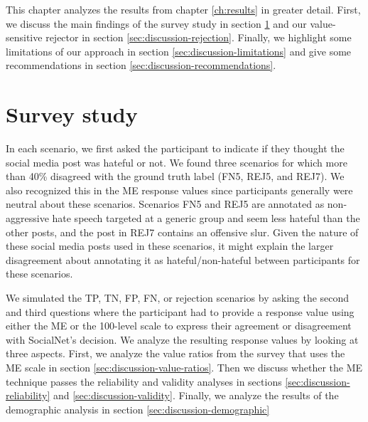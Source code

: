 %
This chapter analyzes the results from chapter \ref{ch:results} in greater detail.
%
First, we discuss the main findings of the survey study in section \ref{sec:discussion-survey} and our value-sensitive rejector in section \ref{sec:discussion-rejection}.
%
Finally, we highlight some limitations of our approach in section \ref{sec:discussion-limitations} and give some recommendations in section \ref{sec:discussion-recommendations}.


\section{Survey study}
\label{sec:discussion-survey}
%
In each scenario, we first asked the participant to indicate if they thought the social media post was hateful or not.
%
We found three scenarios for which more than 40\% disagreed with the ground truth label (FN5, REJ5, and REJ7).
%
We also recognized this in the ME response values since participants generally were neutral about these scenarios.
%
Scenarios FN5 and REJ5 are annotated as non-aggressive hate speech targeted at a generic group and seem less hateful than the other posts, and the post in REJ7 contains an offensive slur.
%
Given the nature of these social media posts used in these scenarios, it might explain the larger disagreement about annotating it as hateful/non-hateful between participants for these scenarios.
%

%
We simulated the TP, TN, FP, FN, or rejection scenarios by asking the second and third questions where the participant had to provide a response value using either the ME or the 100-level scale to express their agreement or disagreement with SocialNet's decision.
%
We analyze the resulting response values by looking at three aspects.
%
First, we analyze the value ratios from the survey that uses the ME scale in section \ref{sec:discussion-value-ratios}.
%
Then we discuss whether the ME technique passes the reliability and validity analyses in sections \ref{sec:discussion-reliability} and \ref{sec:discussion-validity}.
%
Finally, we analyze the results of the demographic analysis in section \ref{sec:discussion-demographic}


